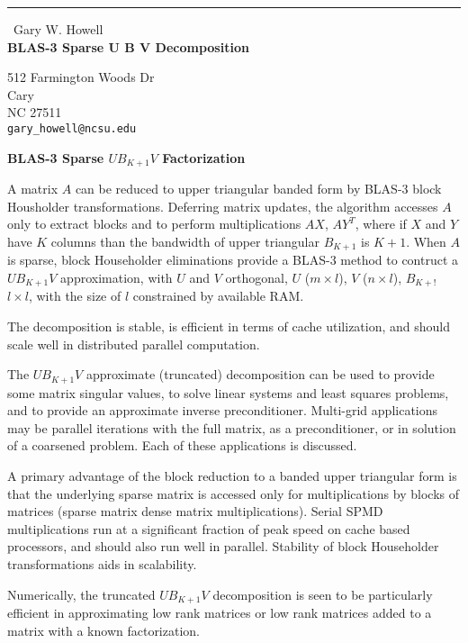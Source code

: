 \documentclass{report}
\begin{document}
\begin{center}
\rule{6in}{1pt} \
{\large Gary W. Howell \\
{\bf  BLAS-3 Sparse U B V Decomposition }}

512 Farmington Woods Dr \\ Cary \\ NC 27511
\\
{\tt gary\_howell@ncsu.edu}\end{center}

\begin{center}
{\large\bf
BLAS-3 Sparse $U B_{K+1}V$ Factorization} \\[4mm]
\end{center}

\par\vspace*{-1.0mm}\noindent
A matrix $A$ can be reduced to upper triangular banded form
by BLAS-3 block Housholder transformations. Deferring matrix updates, the
algorithm accesses $A$ only to extract blocks and to perform
multiplications $AX$, $AY^T$, where if $X$ and $Y$ have $K$ columns than
the bandwidth of upper triangular $B_{K+1}$ is $K+1$. When $A$ is sparse,
block Householder eliminations provide a BLAS-3 method to contruct a $U
B_{K+1}V$ approximation, with $U$ and $V$ orthogonal, $U$ ($m \times l$),
$V$ ($n \times l$), $B_{K+!}$ $l \times l$, with the size of $l$
constrained by available RAM.

The decomposition is stable, is efficient in terms
of cache utilization, and should scale well in distributed parallel computation.

The $U B_{K+1} V$ approximate (truncated) decomposition can be used to
provide some matrix singular values, to solve linear systems and least
squares problems, and to provide an approximate inverse preconditioner.
Multi-grid applications may be parallel iterations with the full matrix,
as a preconditioner, or in solution of a coarsened problem. Each of these
applications is discussed.

A primary advantage of the block reduction to a banded upper triangular
form is that the underlying sparse matrix is accessed only for
multiplications by blocks of matrices (sparse matrix dense matrix
multiplications). Serial SPMD multiplications run at a significant
fraction of peak speed on cache based processors, and should also run
well in parallel. Stability of block Householder transformations aids in
scalability.

Numerically, the truncated $U B_{K+1} V$ decomposition is seen to be
particularly efficient in approximating low rank matrices or low rank
matrices added to a matrix with a known factorization.
\end{document}
